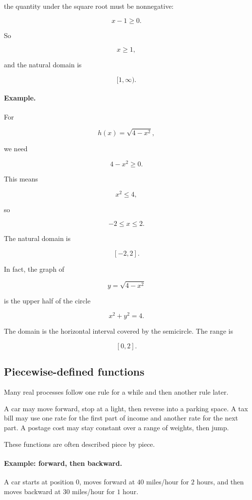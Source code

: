the quantity under the square root must be nonnegative:

\[
x-1\ge 0.
\]

So

\[
x\ge 1,
\]

and the natural domain is

\[
[1,\infty).
\]

\paragraph{Example.}
For

\[
h(x)=\sqrt{4-x^2},
\]

we need

\[
4-x^2\ge 0.
\]

This means

\[
x^2\le 4,
\]

so

\[
-2\le x\le 2.
\]

The natural domain is

\[
[-2,2].
\]

In fact, the graph of

\[
y=\sqrt{4-x^2}
\]

is the upper half of the circle

\[
x^2+y^2=4.
\]

The domain is the horizontal interval covered by the semicircle. The range is

\[
[0,2].
\]

\subsection{Piecewise-defined functions}
\label{subsec:piecewise-functions}

Many real processes follow one rule for a while and then another rule later.

A car may move forward, stop at a light, then reverse into a parking space. A tax bill may use one rate for the first part of income and another rate for the next part. A postage cost may stay constant over a range of weights, then jump.

These functions are often described piece by piece.

\paragraph{Example: forward, then backward.}
A car starts at position \(0\), moves forward at \(40\) miles/hour for \(2\) hours, and then moves backward at \(30\) miles/hour for \(1\) hour.

